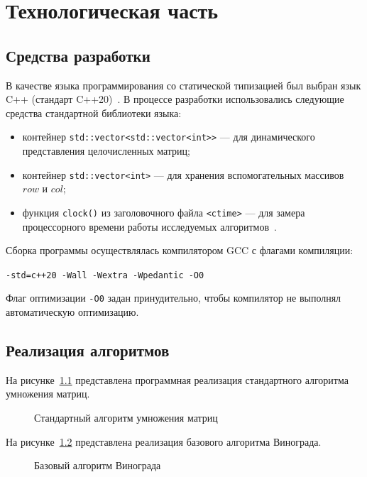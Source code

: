 \chapter{Технологическая часть}

\section{Средства разработки}

В качестве языка программирования со статической типизацией был выбран язык C++ (стандарт C++20)~\cite{iso_cpp}. В процессе разработки использовались следующие средства стандартной библиотеки языка:
\begin{itemize}
    \item контейнер \texttt{std::vector<std::vector<int>>} --- для динамического представления целочисленных матриц;
    \item контейнер \texttt{std::vector<int>} --- для хранения вспомогательных массивов $row$ и $col$;
    \item функция \texttt{clock()} из заголовочного файла \texttt{<ctime>} --- для замера процессорного времени работы исследуемых алгоритмов~\cite{cpp_clock}.
\end{itemize}

Сборка программы осуществлялась компилятором GCC с флагами компиляции:
\begin{center}
\texttt{-std=c++20 -Wall -Wextra -Wpedantic -O0}
\end{center}
Флаг оптимизации \texttt{-O0} задан принудительно, чтобы компилятор не выполнял автоматическую оптимизацию.

\section{Реализация алгоритмов}

На рисунке~\ref{fig:std_mult} представлена программная реализация стандартного алгоритма умножения матриц.
\begin{figure}[H]
    \centering
    
    \caption{Стандартный алгоритм умножения матриц}
    \label{fig:std_mult}
\end{figure}

На рисунке~\ref{fig:winograd_mult} представлена реализация базового алгоритма Винограда.
\begin{figure}[H]
    \centering
    
    \caption{Базовый алгоритм Винограда}
    \label{fig:winograd_mult}
\end{figure}

